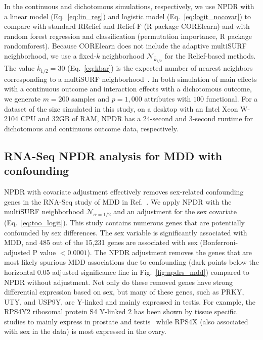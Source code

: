 \documentclass[10pt]{article}
\begin{document}
In the continuous and dichotomous simulations, respectively, we use NPDR with a linear model (Eq.~\ref{eq:lin_reg}) and logistic model (Eq.~\ref{eq:logit_nocovar}) to compare with standard RRelief and Relief-F (R package CORElearn) and with random forest regression and classification (permutation importance, R package randomforest).
Because CORElearn does not include the adaptive multiSURF neighborhood, we use a fixed-$k$ neighborhood $\mathcal{N}_{\bar{k}_{1/2}}$ for the Relief-based methods.
The value $\bar{k}_{1/2}=30$ (Eq.~\ref{eq:kbar}) is the expected number of nearest neighbors corresponding to a multiSURF neighborhood~\cite{bod}.
In both simulation of main effects with a continuous outcome and interaction effects with a dichotomous outcome, we generate $m = 200$ samples and $p = 1,000$ attributes with $100$ functional.
For a dataset of the size simulated in this study, on a desktop with an Intel Xeon W-2104 CPU and 32GB of RAM, NPDR has a 24-second and 3-second runtime for dichotomous and continuous outcome data, respectively.

\subsection{RNA-Seq NPDR analysis for MDD with confounding}
NPDR with covariate adjustment effectively removes sex-related confounding genes in the RNA-Seq study of MDD in Ref.~\cite{mostafavi14}.
We apply NPDR with the multiSURF neighborhood $\mathcal{N}_{\alpha=1/2}$ and an adjustment for the sex covariate (Eq.~\ref{eq:too_logit}).
This study contains numerous genes that are potentially confounded by sex differences.
The sex variable is significantly associated with MDD, and 485 out of the 15,231 genes are associated with sex (Bonferroni-adjusted P value $<0.0001$).
The NPDR adjustment removes the genes that are most likely spurious MDD associations due to confounding (dark points below the horizontal 0.05 adjusted significance line in Fig.~\ref{fig:npdrs_mdd}) compared to NPDR without adjustment.
Not only do these removed genes have strong differential expression based on sex, but many of these genes, such as PRKY, UTY, and USP9Y, are Y-linked and mainly expressed in testis.
For example, the RPS4Y2 ribosomal protein S4 Y-linked 2 has been shown by tissue specific studies to mainly express in prostate and testis~\cite{lopes2010human} while RPS4X (also associated with sex in the data) is most expressed in the ovary.
\end{document}
